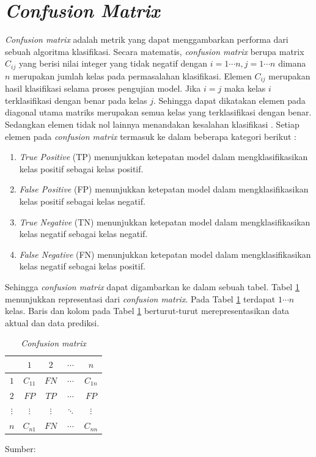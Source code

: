 \section{\textit{Confusion Matrix}}
\textit{Confusion matrix} adalah metrik yang dapat menggambarkan performa dari sebuah algoritma klasifikasi. Secara matematis, \textit{confusion matrix} berupa matrix $C_{ij}$ yang berisi nilai integer yang tidak negatif dengan $i=1\cdots n,j=1\cdots n$ dimana $n$ merupakan jumlah kelas pada permasalahan klasifikasi. Elemen $C_{ij}$ merupakan hasil klasifikasi selama proses pengujian model. Jika $i=j$ maka kelas $i$ terklasifikasi dengan benar pada kelas $j$. Sehingga dapat dikatakan elemen pada diagonal utama matriks merupakan semua kelas yang terklasifikasi dengan benar. Sedangkan elemen tidak nol lainnya menandakan kesalahan klasifikasi \citep{Susmaga2004}. Setiap elemen pada \textit{confusion matrix} termasuk ke dalam beberapa kategori berikut \citep{Shultz2017}:
\begin{enumerate}
    \item \textit{True Positive} (TP) menunjukkan ketepatan model dalam mengklasifikasikan kelas positif sebagai kelas positif.
    \item \textit{False Positive} (FP) menunjukkan ketepatan model dalam mengklasifikasikan kelas positif sebagai kelas negatif.
    \item \textit{True Negative} (TN) menunjukkan ketepatan model dalam mengklasifikasikan kelas negatif sebagai kelas negatif.
    \item \textit{False Negative} (FN) menunjukkan ketepatan model dalam mengklasifikasikan kelas negatif sebagai kelas positif.
\end{enumerate}

Sehingga \textit{confusion matrix} dapat digambarkan ke dalam sebuah tabel. Tabel \ref{tab:conf-mat} menunjukkan representasi dari \textit{confusion matrix}. Pada Tabel \ref{tab:conf-mat} terdapat $1\cdots n$ kelas. Baris dan kolom pada Tabel \ref{tab:conf-mat} berturut-turut merepresentasikan data aktual dan data prediksi.

\begin{table}[H]
    \caption{\textit{Confusion matrix}}
    \centering
    \begin{tabular}{|c|c|c|c|c|}
        \hline
        \           &$1$        &$2$        &$\cdots$   &$n$\\
        \hline
        $1$         &$C_{11}$   &$FN$       &$\cdots$   &$C_{1n}$\\
        \hline
        $2$         &$FP$       &$TP$       &$\cdots$   &$FP$\\
        \hline
        $\vdots$    &$\vdots$   &$\vdots$   &$\ddots$   &$\vdots$\\
        \hline
        $n$         &$C_{n1}$   &$FN$       &$\cdots$   &$C_{nn}$\\
        \hline
    \end{tabular}

    \label{tab:conf-mat}
    Sumber: \citep{Shultz2017}
\end{table}


